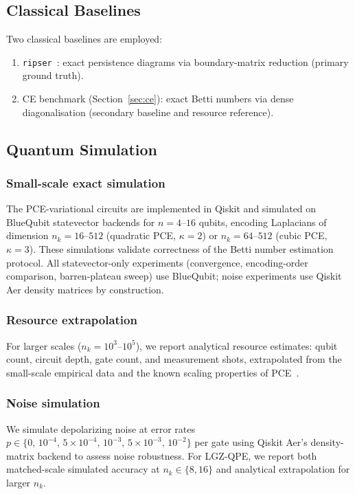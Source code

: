 \documentclass[conference,10pt]{IEEEtran}
\begin{document}
\subsection{Classical Baselines}

Two classical baselines are employed:
\begin{enumerate}
    \item \texttt{ripser}~\cite{bauer2021ripser}: exact persistence
    diagrams via boundary-matrix reduction (primary ground truth).
    \item CE benchmark (Section~\ref{sec:ce}): exact Betti numbers via
    dense diagonalisation (secondary baseline and resource reference).
\end{enumerate}

\subsection{Quantum Simulation}

\subsubsection{Small-scale exact simulation}
The PCE-variational circuits are implemented in Qiskit and simulated
on BlueQubit statevector backends for $n = 4$--$16$ qubits, encoding
Laplacians of dimension $n_k = 16$--$512$ (quadratic PCE, $\kappa =
2$) or $n_k = 64$--$512$ (cubic PCE, $\kappa = 3$). These simulations
validate correctness of the Betti number estimation protocol.
All statevector-only experiments (convergence, encoding-order
comparison, barren-plateau sweep) use BlueQubit; noise experiments use
Qiskit Aer density matrices by construction.

\subsubsection{Resource extrapolation}
For larger scales ($n_k = 10^3$--$10^5$), we report analytical
resource estimates: qubit count, circuit depth, gate count, and
measurement shots, extrapolated from the small-scale empirical data
and the known scaling properties of PCE~\cite{Sciorilli24}.

\subsubsection{Noise simulation}
We simulate depolarizing noise at error rates
$p \in \{0,\, 10^{-4},\, 5 \times 10^{-4},\, 10^{-3},\, 5 \times
10^{-3},\, 10^{-2}\}$ per gate using Qiskit Aer's density-matrix
backend to assess noise robustness. For LGZ-QPE, we report both
matched-scale simulated accuracy at $n_k \in \{8, 16\}$ and analytical
extrapolation for larger $n_k$.
\end{document}
